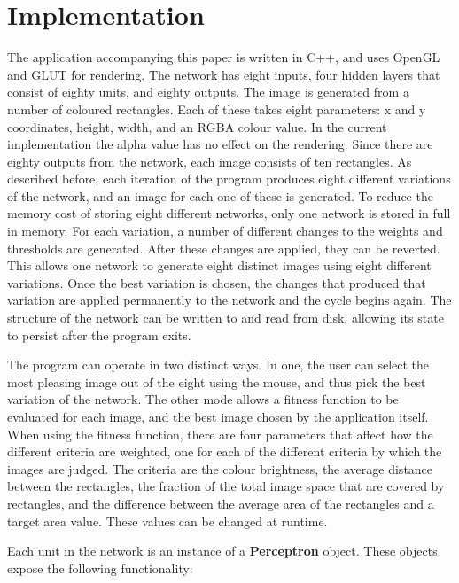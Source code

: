 \documentclass{acm_proc_article-sp}
\begin{document}
\section{Implementation}
\label{sec:impl}
The application accompanying this paper is written in C++, and uses OpenGL and GLUT for rendering. The network has eight inputs, four hidden layers that consist of eighty units, and eighty outputs. The image is generated from a number of coloured rectangles. Each of these takes eight parameters: x and y coordinates, height, width, and an RGBA colour value. In the current implementation the alpha value has no effect on the rendering. Since there are eighty outputs from the network, each image consists of ten rectangles. As described before, each iteration of the program produces eight different variations of the network, and an image for each one of these is generated. To reduce the memory cost of storing eight different networks, only one network is stored in full in memory. For each variation, a number of different changes to the weights and thresholds are generated. After these changes are applied, they can be reverted. This allows one network to generate eight distinct images using eight different variations. Once the best variation is chosen, the changes that produced that variation are applied permanently to the network and the cycle begins again. The structure of the network can be written to and read from disk, allowing its state to persist after the program exits.

\vspace{3mm}

The program can operate in two distinct ways. In one, the user can select the most pleasing image out of the eight using the mouse, and thus pick the best variation of the network. The other mode allows a fitness function to be evaluated for each image, and the best image chosen by the application itself. When using the fitness function, there are four parameters that affect how the different criteria are weighted, one for each of the different criteria by which the images are judged. The criteria are the colour brightness, the average distance between the rectangles, the fraction of the total image space that are covered by rectangles, and the difference between the average area of the rectangles and a target area value. These values can be changed at runtime.

\vspace{3mm}

Each unit in the network is an instance of a \textbf{Perceptron} object. These objects expose the following functionality:
\end{document}
